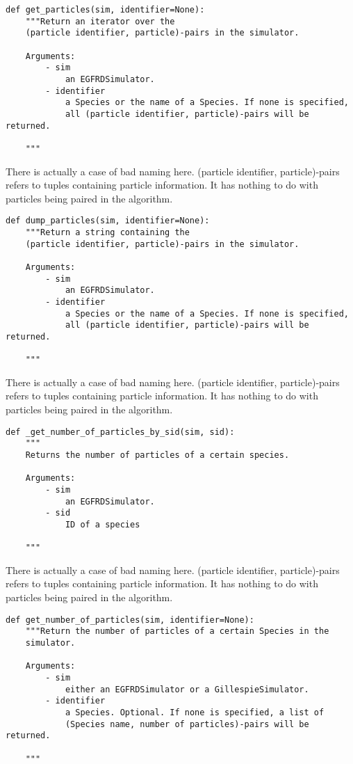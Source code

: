 \documentclass[a4paper,10pt]{article}
\begin{document}
\begin{verbatim}
def get_particles(sim, identifier=None):
    """Return an iterator over the
    (particle identifier, particle)-pairs in the simulator.

    Arguments:
        - sim
            an EGFRDSimulator.
        - identifier
            a Species or the name of a Species. If none is specified, 
            all (particle identifier, particle)-pairs will be returned.

    """
\end{verbatim}
There is actually a case of bad naming here. (particle identifier, particle)-pairs refers to tuples containing particle information. It has nothing to do with particles being paired in the algorithm.

\begin{verbatim}
def dump_particles(sim, identifier=None):
    """Return a string containing the
    (particle identifier, particle)-pairs in the simulator.

    Arguments:
        - sim
            an EGFRDSimulator.
        - identifier
            a Species or the name of a Species. If none is specified, 
            all (particle identifier, particle)-pairs will be returned.

    """
\end{verbatim}
There is actually a case of bad naming here. (particle identifier, particle)-pairs refers to tuples containing particle information. It has nothing to do with particles being paired in the algorithm.

\begin{verbatim}
def _get_number_of_particles_by_sid(sim, sid):
    """ 
    Returns the number of particles of a certain species.

    Arguments:
        - sim
            an EGFRDSimulator.
        - sid
            ID of a species    

    """
\end{verbatim}
There is actually a case of bad naming here. (particle identifier, particle)-pairs refers to tuples containing particle information. It has nothing to do with particles being paired in the algorithm.

\begin{verbatim}
def get_number_of_particles(sim, identifier=None):
    """Return the number of particles of a certain Species in the 
    simulator.

    Arguments:
        - sim
            either an EGFRDSimulator or a GillespieSimulator.
        - identifier
            a Species. Optional. If none is specified, a list of 
            (Species name, number of particles)-pairs will be returned.

    """ 
\end{verbatim}
\end{document}
